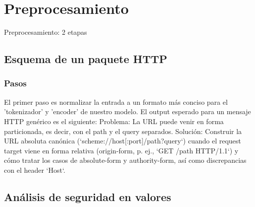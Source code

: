 \documentclass{prgrado}
\begin{document}


\section{Preprocesamiento}

Preprocesamiento: 2 etapas

\subsection{Esquema de un paquete HTTP}

\subsubsection{Pasos}

El primer paso es normalizar la entrada a un formato más conciso para el 'tokenizador' y 'encoder' de nuestro modelo. El output esperado para un mensaje HTTP genérico es el siguiente:
  Problema: La URL puede venir en forma particionada, es decir, con el path y el query separados.
  Solución: Construir la URL absoluta canónica (`scheme://host[:port]/path?query`) cuando el request target viene en forma relativa (origin-form, p. ej., `GET /path HTTP/1.1`) y cómo tratar los casos de absolute-form y authority-form, así como discrepancias con el header `Host`.


 
\subsection{Análisis de seguridad en valores}
\end{document}
